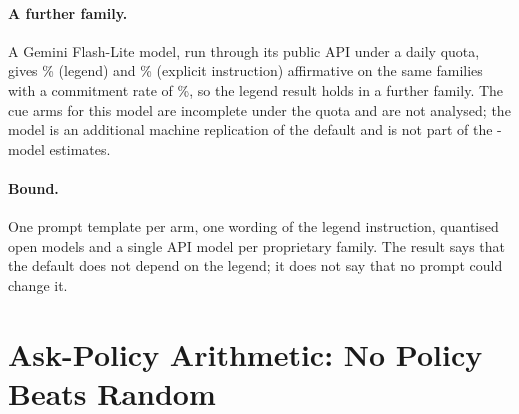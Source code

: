 \paragraph{A further family.}
A Gemini Flash-Lite model, run through its public API under a daily quota, gives \jmgemA{}\% (legend) and \jmgemC{}\% (explicit instruction) affirmative on the same \jmgemN{} families with a commitment rate of \jmgemCommit{}\%, so the legend result holds in a further family. The cue arms for this model are incomplete under the quota and are not analysed; the model is an additional machine replication of the default and is not part of the \jmbreadthModels{}-model estimates.

\paragraph{Bound.}
One prompt template per arm, one wording of the legend instruction, quantised open models and a single API model per proprietary family. The result says that the default does not depend on the legend; it does not say that no prompt could change it.


\section{Ask-Policy Arithmetic: No Policy Beats Random}\label{sec:asks}

